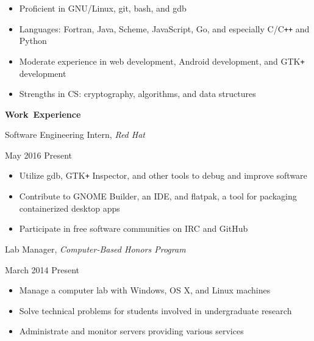 \documentclass[11pt]{article}
\begin{document}
\begin{itemize}
  \item Proficient in GNU/Linux, git, bash, and gdb
  \item Languages: Fortran, Java, Scheme, JavaScript, Go, and especially C/C\texttt{++} and Python
  \item Moderate experience in web development, Android development, and GTK\texttt{+} development
  \item Strengths in CS: cryptography, algorithms, and data structures
\end{itemize}

\vspace{0.8em}
\hbox{\large \textbf{Work Experience}}

\begin{minipage}[t]{0.65\textwidth}
\flushleft
Software Engineering Intern, \textit{Red Hat}\\
\end{minipage}
\begin{minipage}[t]{0.30\textwidth}
\flushright
May 2016 \space \textemdash \space Present\\
\end{minipage}

\begin{itemize}
  \item Utilize gdb, GTK\texttt{+} Inspector, and other tools to debug and improve software
  \item Contribute to GNOME Builder, an IDE, and flatpak, a tool for packaging containerized desktop apps
  \item Participate in free software communities on IRC and GitHub
\end{itemize}

\begin{minipage}[t]{0.65\textwidth}
\flushleft
Lab Manager, \textit{Computer-Based Honors Program}\\
\end{minipage}
\begin{minipage}[t]{0.30\textwidth}
\flushright
March 2014 \space \textemdash \space Present\\
\end{minipage}

\begin{itemize}
  \item Manage a computer lab with Windows, OS X, and Linux machines
  \item Solve technical problems for students involved in undergraduate research
  \item Administrate and monitor servers providing various services
\end{itemize}
\end{document}
